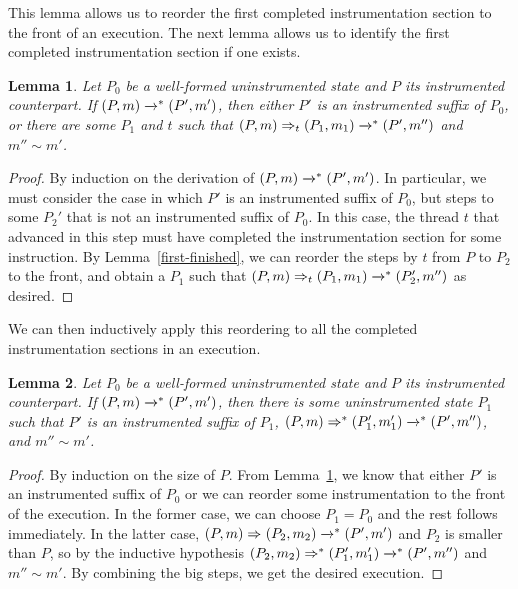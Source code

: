 \documentclass[preprint, 9pt]{sigplanconf}
\newcommand{\cfg}[2]{\ensuremath{(#1, #2)}}
\newcommand{\execstar}[4]{\ensuremath{\cfg{#1}{#2} \tto{#3} #4}}
\newcommand{\iexec}[4]{\ensuremath{\cfg{#1}{#2} \Rightarrow_{#3} #4}}
\newcommand{\execstars}[2]{\ensuremath{ \tto{#1} #2}}
\newcommand{\iexecstar}[3]{\ensuremath{(#1, #2) \Rightarrow^{*} #3}}
\newcommand{\tto}[1]{\mathrel{
  \vphantom{\xrightarrow{#1}}
  \smash{\xrightarrow{#1}}
  \vphantom{\to}^{*}}
}
\newtheorem{lemma}{Lemma}
\begin{document}
 This lemma allows us to reorder the first completed instrumentation section to the front of an execution. The next lemma allows us to identify the first completed instrumentation section if one exists.
 \begin{lemma}\label{next-iexec}Let $P_0$ be a well-formed uninstrumented state and $P$ its instrumented counterpart. If $\execstar{P}{m}{}{(P', m')}$, then either $P'$ is an instrumented suffix of $P_0$, or there are some $P_1$ and $t$ such that $\iexec{P}{m}{t}{(P_1, m_1)} \execstars{}{(P', m'')}$ and $m'' \sim m'$.\end{lemma}
 \begin{proof}By induction on the derivation of $\execstar{P}{m}{}{(P', m')}$. In particular, we must consider the case in which $P'$ is an instrumented suffix of $P_0$, but steps to some $P_2'$ that is not an instrumented suffix of $P_0$. In this case, the thread $t$ that advanced in this step must have completed the instrumentation section for some instruction. By Lemma~\ref{first-finished}, we can reorder the steps by $t$ from $P$ to $P_2$ to the front, and obtain a $P_1$ such that $\iexec{P}{m}{t}{(P_1, m_1)} \execstars{}{(P_2', m'')}$ as desired.\end{proof}

 We can then inductively apply this reordering to all the completed instrumentation sections in an execution.
 \begin{lemma}\label{exec-iexec1}Let $P_0$ be a well-formed uninstrumented state and $P$ its instrumented counterpart. If $\execstar{P}{m}{}{(P', m')}$, then there is some uninstrumented state $P_1$ such that $P'$ is an instrumented suffix of $P_1$, $\iexecstar{P}{m}{(P_1', m_1')} \execstars{}{(P', m'')}$, and $m'' \sim m'$.\end{lemma}
 \begin{proof}By induction on the size of $P$. From Lemma~\ref{next-iexec}, we know that either $P'$ is an instrumented suffix of $P_0$ or we can reorder some instrumentation to the front of the execution. In the former case, we can choose $P_1 = P_0$ and the rest follows immediately. In the latter case, $\iexec{P}{m}{}{(P_2, m_2)} \execstars{}{(P', m')}$ and $P_2$ is smaller than $P$, so by the inductive hypothesis $\iexecstar{P_2}{m_2}{(P_1', m_1')} \execstars{}{(P', m'')}$ and $m'' \sim m'$. By combining the big steps, we get the desired execution.\end{proof}
\end{document}
